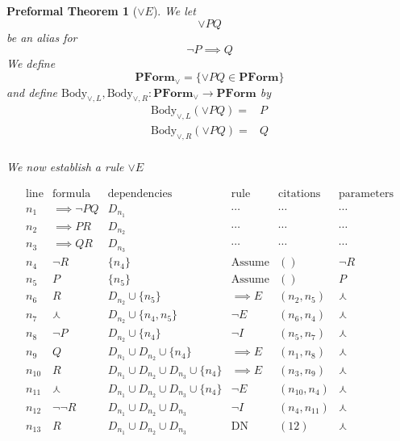 \documentclass[oneside, 12pt]{book}
\theoremstyle{break}
\newtheorem{preformal definition}[definition]{Preformal Definition}
\newtheorem{preformal theorem}[theorem]{Preformal Theorem}
\begin{document}
		
		\begin{preformal theorem}[$\lor E$]
			We let
			\begin{equation*}
				\lor PQ
			\end{equation*}
			be an alias for
			\begin{equation*}
				\lnot P \implies Q
			\end{equation*}
			We define 
			\begin{equation*}
				\textbf{PForm}_{\lor} = \{\lor PQ \in \textbf{PForm}\}
			\end{equation*}
			and define $\text{Body}_{\lor, L}, \text{Body}_{\lor, R}: \textbf{PForm}_{\lor} \to \textbf{PForm}$ by
			\begin{align*}
				\text{Body}_{\lor, L}(\lor PQ) =& P\\
				\text{Body}_{\lor, R}(\lor PQ) =& Q\\				
			\end{align*}
						
			We now establish a rule $\lor E$
			
			\begin{equation*}
				\begin{array}{c|c|c|c|c|c}
					\text{line} & \text{formula} & \text{dependencies} & \text{rule} & \text{citations} & \text{parameters}\\ \hline
					n_1& \implies \lnot P Q& D_{n_1} & \cdots & \cdots & \cdots \\
					n_2 & \implies PR & D_{n_2} & \cdots & \cdots & \cdots\\
					n_3 & \implies QR & D_{n_3} & \cdots & \cdots & \cdots\\
					n_4 & \lnot R & \{n_4\} & \text{Assume} & () & \lnot R\\
					n_5 & P & \{n_5\} & \text{Assume} & () & P\\
					n_6 & R & D_{n_2} \cup \{n_5\} & \implies E & (n_2, n_5) & \curlywedge\\
					n_7 & \curlywedge & D_{n_2} \cup \{n_4, n_5\} & \lnot E & (n_6, n_4) & \curlywedge\\
					n_8 & \lnot P & D_{n_2} \cup \{n_4\} & \lnot I & (n_5, n_7) & \curlywedge\\
					n_9 & Q & D_{n_1} \cup D_{n_2} \cup \{n_4\} & \implies E & (n_1, n_8) & \curlywedge\\
					n_{10} & R & D_{n_1} \cup D_{n_2} \cup D_{n_3} \cup \{n_4\} & \implies E & (n_3, n_9) & \curlywedge\\
					n_{11} & \curlywedge & D_{n_1} \cup D_{n_2} \cup D_{n_3} \cup \{n_4\} & \lnot E & (n_{10}, n_4) & \curlywedge\\
					n_{12} & \lnot \lnot R & D_{n_1} \cup D_{n_2} \cup D_{n_3} & \lnot I & (n_4, n_{11}) & \curlywedge\\
					n_{13} & R & D_{n_1} \cup D_{n_2} \cup D_{n_3} & \text{DN} & (12) & \curlywedge
				\end{array}
			\end{equation*}			
			

\end{preformal theorem}
\end{document}
